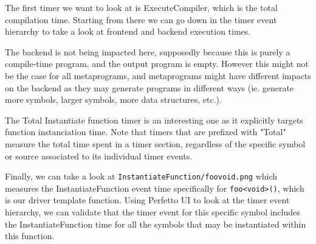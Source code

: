 \documentclass[../../main.tex]{subfiles}
\begin{document}

The first timer we want to look at is ExecuteCompiler, which is the total
compilation time. Starting from there we can go down in the timer event
hierarchy to take a look at frontend and backend execution times.



The backend is not being impacted here, supposedly because this is purely a
compile-time program, and the output program is empty. However this might not be
the case for all metaprograms, and metaprograms might have different impacts on
the backend as they may generate programs in different ways (ie. generate more
symbols, larger symbols, more data structures, etc.).


The Total Instantiate function timer is an interesting one as it explicitly
targets function instanciation time. Note that timers that are prefixed with
"Total" measure the total time spent in a timer section, regardless of the
specific symbol or source associated to its individual timer events.


Finally, we can take a look at \lstinline{InstantiateFunction/foovoid.png} which
measures the InstantiateFunction event time specifically for
\lstinline{foo<void>()}, which is our driver template function. Using Perfetto
UI to look at the timer event hierarchy, we can validate that the timer event
for this specific symbol includes the InstantiateFunction time for all the
symbols that may be instantiated within this function.
\end{document}
